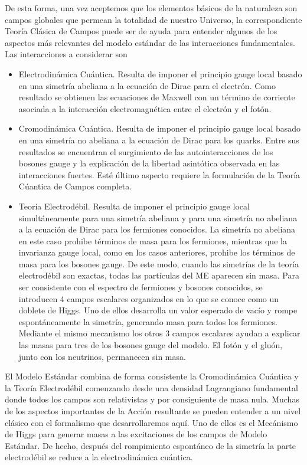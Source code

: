 De esta forma, una vez aceptemos que los elementos básicos de la naturaleza son campos globales que permean la totalidad de nuestro Universo, la correspondiente Teoría Clásica de Campos puede ser de ayuda para entender algunos de los aspectos más relevantes del modelo estándar de las interacciones fundamentales. Las interacciones a considerar son
\begin{itemize}
\item Electrodinámica Cuántica. Resulta de imponer el principio gauge
  local basado en una simetría abeliana a la ecuación de Dirac para el
  electrón. Como resultado se obtienen las ecuaciones de Maxwell con
  un término de corriente asociada a la interacción electromagnética
  entre el electrón y el fotón.
\item Cromodinámica Cuántica. Resulta de imponer el principio gauge
  local basado en una simetría no abeliana a la ecuación de Dirac para
  los quarks. Entre sus resultados se encuentran el surgimiento de las
  autointeracciones de los bosones gauge y la  explicación de la libertad asintótica
  observada en las interacciones fuertes. Esté último aspecto requiere la formulación de la Teoría Cúantica de Campos completa.
\item Teoría Electrodébil. Resulta de imponer el principio gauge local
  simultáneamente para una simetría abeliana y para una simetría no
  abeliana a la ecuación de Dirac para los fermiones conocidos. La
  simetría no abeliana en este caso prohibe términos de masa para los
  fermiones, mientras que la invarianza gauge local, como en los casos
  anteriores, prohibe los términos de masa para los bosones gauge. De
  este modo, cuando las simetrías de la teoría electrodébil son
  exactas, todas las partículas del ME aparecen sin masa. Para ser
  consistente con el espectro de fermiones y bosones conocidos, se
  introducen 4 campos escalares organizados en lo que se
  conoce como un doblete de Higgs. Uno de ellos desarrolla un valor
  esperado de vacío y rompe espontáneamente la simetría, generando
  masa para todos los fermiones. Mediante el mismo mecanismo los otros
  3 campos escalares ayudan a explicar las masas para tres de los
  bosones gauge del modelo. El fotón y el gluón, junto con los
  neutrinos, permanecen sin masa.
\end{itemize} %

El Modelo Estándar combina de forma consistente la Cromodinámica
Cuántica y la Teoría Electrodébil comenzando desde una densidad
Lagrangiano fundamental donde todos los campos son relativistas y por
consiguiente de masa nula. Muchas de los aspectos importantes de la
Acción resultante se pueden entender a un nivel clásico con el
formalismo que desarrollaremos aquí.  Uno de ellos es el Mecánismo de
Higgs para generar masas a las excitaciones de los campos de Modelo
Estándar. De hecho, después del rompimiento espontáneo de la simetría
la parte electrodébil se reduce a la electrodinámica cuántica. 

